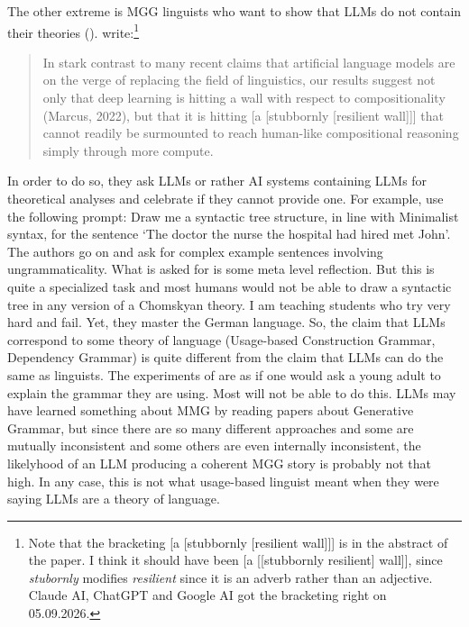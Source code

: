 The other extreme is MGG linguists who want to show that LLMs do not contain their
theories (\eg \citealt{MurphyLeivadaDentella2025a-u}). \citet{MurphyLeivadaDentella2025a-u} write:\footnote{
  Note that the bracketing [a [stubbornly [resilient wall]]] is in the abstract of the paper. I
  think it should have been [a [[stubbornly resilient] wall]], since \emph{stubornly} modifies
  \emph{resilient} since it is an adverb rather than an adjective. Claude AI, ChatGPT and Google AI
  got the bracketing right on 05.09.2026.
}
\begin{quote}
In stark contrast to many recent claims that artificial language models are on the verge of
replacing the field of linguistics, our results suggest not only that deep learning is hitting a
wall with respect to compositionality (Marcus, 2022), but that it is hitting [a [stubbornly
[resilient wall]]] that cannot readily be surmounted to reach human-like compositional reasoning
simply through more compute. \citep[1--2]{MurphyLeivadaDentella2025a-u}
\end{quote}
In order to do so, they ask LLMs or rather AI systems containing LLMs for theoretical analyses and
celebrate if they cannot provide one. For example, \citet[11]{MurphyLeivadaDentella2025a-u} use the following prompt:
\ea
Draw me a syntactic tree structure, in line with Minimalist syntax,
for the sentence `The doctor the nurse the hospital had hired met John'.
\z
%
The authors go on and ask for complex example sentences involving ungrammaticality. What is asked
for is some meta level reflection. But this is quite a specialized task and most humans would not be
able to draw a syntactic tree in any version of a Chomskyan theory. I am teaching students who try
very hard and fail. Yet, they master the German language. So, the claim that LLMs correspond to some
theory of language (Usage-based Construction Grammar, Dependency Grammar) is quite different from
the claim that LLMs can do the same as linguists. The experiments of
\citet{MurphyLeivadaDentella2025a-u} are as if one would ask a young adult to explain the grammar
they are using. Most will not be able to do this. LLMs may have learned something about MMG by reading papers
about Generative Grammar, but since there are so many different approaches and some are mutually
inconsistent and some others are even internally inconsistent, the likelyhood of an LLM producing a
coherent MGG story is probably not that high. In any case, this is not what usage-based linguist
meant when they were saying LLMs are a theory of language.
\fi



